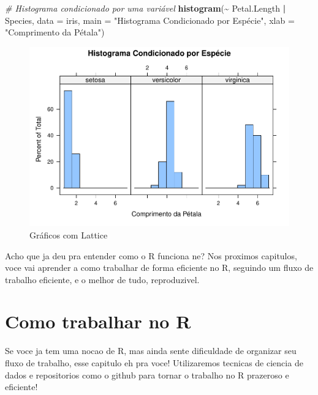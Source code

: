 \documentclass[
]{book}
\newenvironment{Shaded}{\begin{snugshade}}{\end{snugshade}}
\newcommand{\AttributeTok}[1]{\textcolor[rgb]{0.13,0.29,0.53}{#1}}
\newcommand{\CommentTok}[1]{\textcolor[rgb]{0.56,0.35,0.01}{\textit{#1}}}
\newcommand{\FunctionTok}[1]{\textcolor[rgb]{0.13,0.29,0.53}{\textbf{#1}}}
\newcommand{\NormalTok}[1]{#1}
\newcommand{\SpecialCharTok}[1]{\textcolor[rgb]{0.81,0.36,0.00}{\textbf{#1}}}
\newcommand{\StringTok}[1]{\textcolor[rgb]{0.31,0.60,0.02}{#1}}
\begin{document}
\begin{Shaded}
\begin{Highlighting}[]
\CommentTok{\# Histograma condicionado por uma variável}
\FunctionTok{histogram}\NormalTok{(}\SpecialCharTok{\textasciitilde{}}\NormalTok{ Petal.Length }\SpecialCharTok{|}\NormalTok{ Species, }\AttributeTok{data =}\NormalTok{ iris,}
          \AttributeTok{main =} \StringTok{"Histograma Condicionado por Espécie"}\NormalTok{,}
          \AttributeTok{xlab =} \StringTok{"Comprimento da Pétala"}\NormalTok{)}
\end{Highlighting}
\end{Shaded}

\begin{figure}
\centering
\includegraphics{_main_files/figure-latex/nome-do-chunk-2.pdf}
\caption{\label{fig:nome-do-chunk-2}Gráficos com Lattice}
\end{figure}

Acho que ja deu pra entender como o R funciona ne? Nos proximos capitulos, voce vai aprender a como trabalhar de forma eficiente no R, seguindo um fluxo de trabalho eficiente, e o melhor de tudo, reproduzivel.

\hypertarget{como-trabalhar-no-r}{%
\chapter{Como trabalhar no R}\label{como-trabalhar-no-r}}

Se voce ja tem uma nocao de R, mas ainda sente dificuldade de organizar seu fluxo de trabalho, esse capitulo eh pra voce! Utilizaremos tecnicas de ciencia de dados e repositorios como o github para tornar o trabalho no R prazeroso e eficiente!
\end{document}
